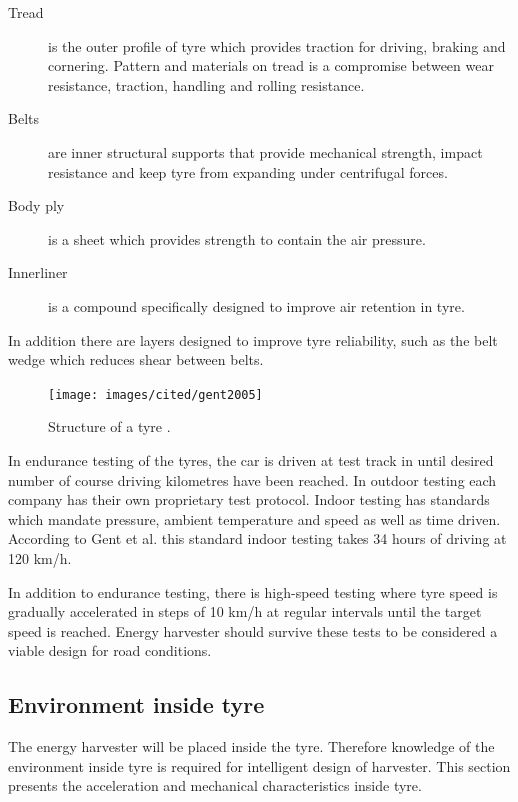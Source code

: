 \begin{description}
  \item[Tread] is the outer profile of tyre which provides traction for driving, braking and cornering. Pattern and materials on
tread is a compromise between wear resistance, traction, handling and rolling
resistance.
  \item[Belts] are inner structural supports that provide mechanical strength, impact resistance and keep tyre from expanding
under centrifugal forces.
  \item[Body ply] is a sheet which provides strength to contain the air pressure.
  \item[Innerliner] is a compound specifically designed to improve air retention in tyre.
\end{description}
In addition there are layers designed to improve tyre reliability, such as the belt
wedge which reduces shear between belts. 


\begin{figure}[h]
\begin{center}
\texttt{[image: images/cited/gent2005]}
\end{center}
\caption{Structure of a tyre \cite{Gent2005}.}
\label{fig:tyre_structure_diagram}
\end{figure}


In endurance testing of the tyres, the car is driven at test track in until
desired number of course driving kilometres have been reached. In outdoor testing
each company has their own proprietary test protocol. Indoor testing has standards
which mandate pressure, ambient temperature and speed as well as time driven.
According to Gent et al. \cite{Gent2005} this standard indoor testing takes 34 hours of driving at 120
km/h.

In addition to endurance testing, there is high-speed testing where tyre speed is
gradually accelerated in steps of 10 km/h at regular intervals until the target speed is
reached. Energy harvester should survive these tests to be considered a viable design for road conditions.


\subsection{Environment inside tyre} \label{sect:tyre_environment}
The energy harvester will be placed inside the tyre. Therefore knowledge of the environment inside tyre is required for intelligent design of harvester. This section presents the acceleration and mechanical characteristics inside tyre. 

